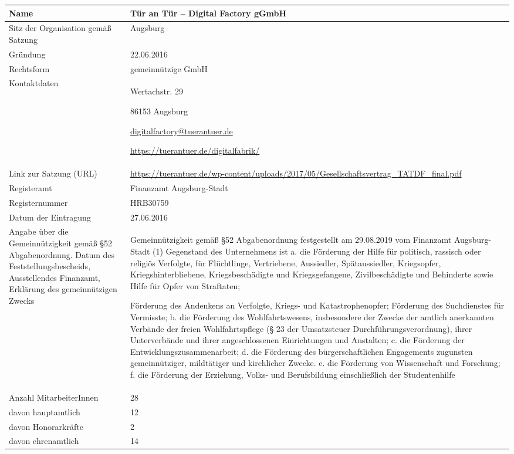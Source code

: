 \documentclass[12pt, a4paper]{article} %
\begin{document}
\noindent\begin{adjustwidth}{-1cm}{-1cm}
  \begin{tabularx}{\textwidth+2cm}{p{5cm}X}
  \toprule
  Name & Tür an Tür – Digital Factory gGmbH\tabularnewline
  \midrule
  Sitz der Organisation gemäß Satzung & Augsburg\tabularnewline
  \midrule
  Gründung & 22.06.2016\tabularnewline
  \midrule
  Rechtsform & gemeinnützige GmbH\tabularnewline
  \midrule
  \begin{minipage}[t]{0.47\columnwidth}\raggedright
  Kontaktdaten\strut
  \end{minipage} & \begin{minipage}[t]{\columnwidth}
  Wertachstr. 29
  
  86153 Augsburg
  
  \href{mailto:digitalfactory@tuerantuer.de}{\url{digitalfactory@tuerantuer.de}}
  
  \url{https://tuerantuer.de/digitalfabrik/}
  \end{minipage}\tabularnewline
  \midrule
  Link zur Satzung (URL) & \url{https://tuerantuer.de/wp-content/uploads/2017/05/Gesellschaftsvertrag\_TATDF\_final.pdf}\tabularnewline
  \midrule
  Registeramt & Finanzamt Augsburg-Stadt\tabularnewline
  Registernummer & HRB30759\tabularnewline
  Datum der Eintragung & 27.06.2016\tabularnewline
  \midrule
  Angabe über die Gemeinnützigkeit gemäß §52 Abgabenordnung. Datum des
Feststellungsbescheids, Ausstellendes Finanzamt, Erklärung des
gemeinnützigen Zwecks & Gemeinnützigkeit gemäß §52 Abgabenordnung festgestellt am 29.08.2019 vom
  Finanzamt Augsburg-Stadt 
  (1) Gegenstand des Unternehmens ist a. die Förderung der Hilfe für
  politisch, rassisch oder religiös Verfolgte, für Flüchtlinge,
  Vertriebene, Aussiedler, Spätaussiedler, Kriegsopfer,
  Kriegshinterbliebene, Kriegsbeschädigte und Kriegsgefangene,
  Zivilbeschädigte und Behinderte sowie Hilfe für Opfer von Straftaten;
  
  Förderung des Andenkens an Verfolgte, Kriegs- und Katastrophenopfer;
  Förderung des Suchdienstes für Vermisste; b. die Förderung des
  Wohlfahrtswesens, insbesondere der Zwecke der amtlich anerkannten
  Verbände der freien Wohlfahrtspflege (§ 23 der Umsatzsteuer
  Durchführungsverordnung), ihrer Unterverbände und ihrer angeschlossenen
  Einrichtungen und Anstalten; c. die Förderung der
  Entwicklungszusammenarbeit; d. die Förderung des bürgerschaftlichen
  Engagements zugunsten gemeinnütziger, mildtätiger und kirchlicher
  Zwecke. e. die Förderung von Wissenschaft und Forschung; f. die
  Förderung der Erziehung, Volks- und Berufsbildung einschließlich der
  Studentenhilfe\tabularnewline
  \midrule
  Anzahl MitarbeiterInnen & 28 \tabularnewline
  davon hauptamtlich & 12 \tabularnewline
  davon Honorarkräfte & 2 \tabularnewline
  davon ehrenamtlich & 14 \tabularnewline
  \bottomrule
  \end{tabularx}
  \end{adjustwidth}
\end{document}
